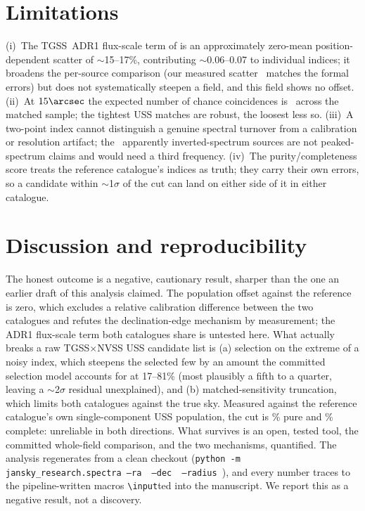 \documentclass[twocolumn]{aastex631}
\newcommand{\code}[1]{\texttt{#1}}
\begin{document}
\section{Limitations}
(i)~The TGSS~ADR1 flux-scale term of \citet{hurleywalker2017} is an approximately zero-mean
position-dependent scatter of $\sim$15--17\%, contributing $\sim$0.06--0.07 to individual
indices; it broadens the per-source comparison (our measured scatter \usRealScatter\ matches the
formal errors) but does not systematically steepen a field, and this field shows no offset.
(ii)~At $15\arcsec$ the expected number of chance coincidences is \usChanceMatches\ across the
matched sample; the tightest USS matches are robust, the loosest less so. (iii)~A two-point index
cannot distinguish a genuine spectral turnover from a calibration or resolution artifact; the
\usNinverted\ apparently inverted-spectrum sources are not peaked-spectrum claims and would need a
third frequency. (iv)~The purity/completeness score treats the reference catalogue's indices as
truth; they carry their own errors, so a candidate within $\sim$1$\sigma$ of the cut can land on
either side of it in either catalogue.

\section{Discussion and reproducibility}
The honest outcome is a negative, cautionary result, sharper than the one an earlier draft of this
analysis claimed. The population offset against the reference is zero, which excludes a relative calibration
difference between the two catalogues and refutes the declination-edge mechanism by measurement;
the ADR1 flux-scale term both catalogues share is untested here. What actually breaks a raw TGSS$\times$NVSS USS candidate list is (a) selection on
the extreme of a noisy index, which steepens the selected few by an amount the committed
selection model accounts for at 17--81\% (most plausibly a fifth to a quarter, leaving a $\sim$2$\sigma$
residual unexplained), and (b) matched-sensitivity truncation, which
limits both catalogues against the true sky. Measured against the reference
catalogue's own single-component USS population, the cut is \usRealPurityPct\% pure and \usRealCompletenessPct\%
complete: unreliable in both directions. What survives is an open, tested tool, the committed
whole-field comparison, and the two mechanisms, quantified. The analysis regenerates from a clean
checkout (\code{python -m jansky\_research.spectra --ra \usFieldRa\ --dec \usFieldDec\ --radius
\usRadius}), and every number traces to the pipeline-written macros
\code{\textbackslash input}ted into the manuscript. We report this as a negative result, not a
discovery.
\end{document}
